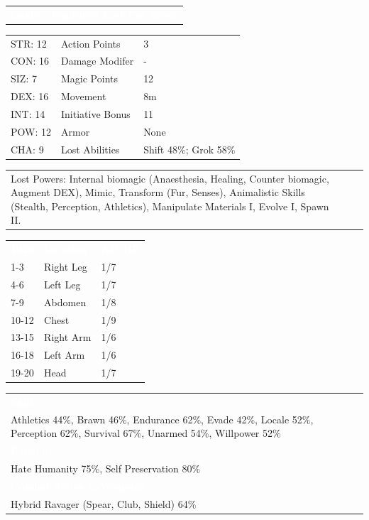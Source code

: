 \documentclass[letterpaper,serif]{rpg-module}
\begin{document}

\vspace{12pt}

\noindent\begin{tabularx}{\linewidth}{X}
\rowcolor{gray}
\textcolor{white}{\textbf{Emily - Captured Lost Cat Scout}}
\end{tabularx}
\begin{tabularx}{\linewidth}{XXX}
STR: 12 & Action Points & 3 \\
CON: 16 & Damage Modifer & - \\
SIZ: 7 & Magic Points & 12 \\
DEX: 16 & Movement & 8m \\
INT: 14 & Initiative Bonus & 11 \\
POW: 12 & Armor & None \\
CHA: 9 & Lost Abilities & Shift 48\%; Grok 58\% \\
\end{tabularx}
\begin{tabularx}{\linewidth}{XXX}
Lost Powers: Internal biomagic (Anaesthesia, Healing, Counter biomagic, Augment DEX), Mimic, Transform (Fur, Senses), Animalistic Skills (Stealth, Perception, Athletics), Manipulate Materials I, Evolve I, Spawn II. 
\end{tabularx}

\begin{tabularx}{\linewidth}{XXX}
\rowcolor{gray}
\textcolor{white}{\textbf{1d20}} & \textcolor{white}{\textbf{Location}} & \textcolor{white}{\textbf{AP/HP}} \\
1-3 & Right Leg & 1/7 \\
4-6 & Left Leg & 1/7 \\
7-9 & Abdomen & 1/8 \\
10-12 & Chest & 1/9 \\
13-15 & Right Arm & 1/6 \\
16-18 & Left Arm & 1/6 \\
19-20 & Head & 1/7 
\end{tabularx}

\begin{tabularx}{\linewidth}{X}
\rowcolor{gray}
\textcolor{white}{\textbf{Skills}} \\
Athletics 44\%, Brawn 46\%, Endurance 62\%, Evade 42\%, Locale 52\%, Perception 62\%, Survival 67\%, Unarmed 54\%, Willpower 52\%\\
\rowcolor{gray}
\textcolor{white}{\textbf{Passions}} \\
Hate Humanity 75\%, Self Preservation 80\% \\
\rowcolor{gray}
\textcolor{white}{\textbf{Combat Styles \& Weapons}} \\
Hybrid Ravager (Spear, Club, Shield) 64\%
\end{tabularx}
\end{document}
